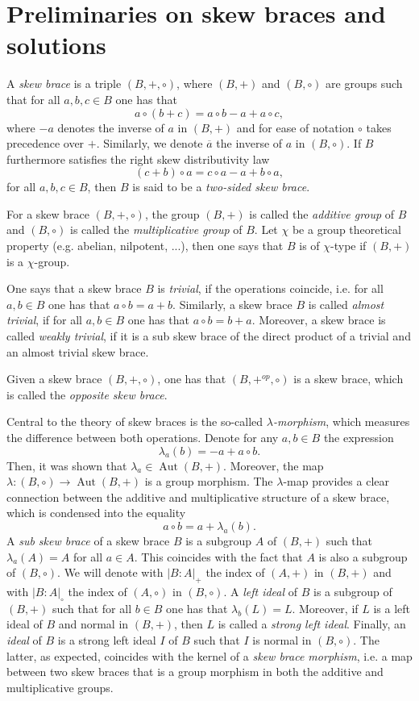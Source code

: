 \documentclass{amsart}
\newcommand{\Aut}{\operatorname{Aut}}
\begin{document}
\section{Preliminaries on skew braces and solutions}

    A \textit{skew brace} is a triple $(B,+,\circ)$, where $(B,+)$ and $(B,\circ)$ are groups such that for all $a,b,c \in B$ one has that $$ a \circ (b+c) = a \circ b - a + a\circ c,$$
    where $-a$ denotes the inverse of $a$ in $(B,+)$ and for ease of notation $\circ$ takes precedence over $+$. 
    Similarly, we denote $\overline{a}$ the inverse of $a$ in $(B,\circ)$.
    If $B$ furthermore satisfies the right skew distributivity law $$ (c+b) \circ a = c\circ a -a + b\circ a,$$ for all $a,b,c \in B$, then $B$ is said to be a \textit{two-sided skew brace}.

    For a skew brace $(B,+,\circ)$, the group $(B,+)$ is called the \textit{additive group} of $B$ and $(B,\circ)$ is called the \textit{multiplicative group} of $B$. 
    Let $\chi$ be a group theoretical property (e.g. abelian, nilpotent, ...), then one says that $B$ is of $\chi$-type if $(B,+)$ is a $\chi$-group.

    One says that a skew brace $B$ is \textit{trivial}, if the operations coincide, i.e. for all $a,b \in B$ one has that $a\circ b =  a+b$. Similarly, a skew brace $B$ is called \textit{almost trivial}, if for all $a,b\in B$ one has that $a\circ b= b+a$. Moreover, a skew brace is called \textit{weakly trivial}, if it is a sub skew brace of the direct product of a trivial and an almost trivial skew brace.

    Given a skew brace $(B,+,\circ)$, one has that $(B,+^{op},\circ)$ is a skew brace, which is called the \textit{opposite skew brace}.
    
    Central to the theory of skew braces is the so-called \textit{$\lambda$-morphism}, which measures the difference between both operations. Denote for any $a,b \in B$ the expression $$ \lambda_a(b) = -a+a\circ b.$$
    Then, it was shown that $\lambda_a \in \Aut(B,+)$. Moreover, the map $\lambda\colon (B,\circ) \rightarrow \Aut(B,+)$ is a group morphism. The $\lambda$-map provides a clear connection between the additive and multiplicative structure of a skew brace, which is condensed into the equality $$ a\circ b =  a + \lambda_a(b).$$
    A \textit{sub skew brace} of a skew brace $B$ is a subgroup $A$ of $(B,+)$ such that $\lambda_a(A)=A$ for all $a\in A$. This coincides with the fact that $A$ is also a subgroup of $(B,\circ)$.
     We will denote with $|B:A|_+$ the index of $(A,+)$ in $(B,+)$ and
     with $|B:A|_\circ$ the index of $(A,\circ)$ in $(B,\circ)$.
    A \textit{left ideal} of $B$ is a subgroup of $(B,+)$ such that for all $b \in B$ one has that $\lambda_b(L)=L$. 
    Moreover, if $L$ is a left ideal of $B$ and normal in $(B,+)$, then $L$ is called a \textit{strong left ideal}. 
    Finally, an \textit{ideal} of $B$ is a strong left ideal $I$ of $B$ such that $I$ is normal in $(B,\circ)$. The latter, as expected, coincides with the kernel of a \textit{skew brace morphism}, i.e. a map between two skew braces that is a group morphism in both the additive and multiplicative groups.
\end{document}
